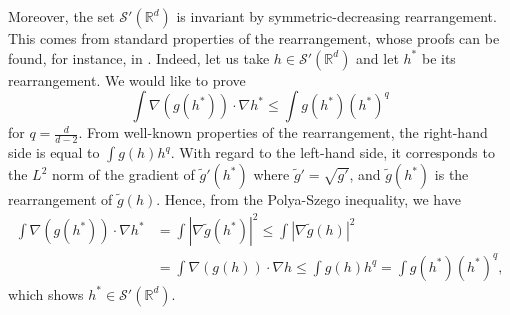 \documentclass[11pt,a4paper]{article}
\numberwithin{equation}{section}
\newcommand{\R}{{\mathbb{R}}}
\theoremstyle{plain}
\theoremstyle{remark}
\newcommand {\f}{\frac}
\begin{document}
Moreover, the set $\mathcal{S'}(\R^d)$ is invariant by symmetric-decreasing rearrangement. This comes from standard properties of the rearrangement, whose proofs can be found, for instance, in \cite{Elliot_Loss01}.
Indeed, let us take $h\in \mathcal{S'}(\R^d)$ and let $h^*$ be its rearrangement. We would like to prove 
$$ 
    \int \nabla(g(h^*))\cdot\nabla h^*\leq\int g(h^*) (h^*)^q 
$$
for $q = \frac{d}{d-2}$.
From well-known properties of the rearrangement, the right-hand side is equal to   $\int g(h) h^q$. With regard to   the left-hand side, it corresponds to the $L^2$ norm of the gradient of $\tilde g'(h^*)$ where $\tilde g'=\sqrt{g'}$, and  $\tilde g(h^*)$ is the rearrangement of  $\tilde g(h)$. Hence, from the Polya-Szego inequality, we have
\begin{align*}
    \int \nabla(g(h^*))\cdot\nabla h^* & = \int |\nabla \tilde g(h^*)|^2\leq  \int |\nabla \tilde g(h)|^2\\
    &= \int \nabla(g(h))\cdot\nabla h\leq \int g(h) h^q=\int g(h^*) (h^*)^q,
\end{align*}
which shows $h^*\in \mathcal{S'}(\R^d)$.
%
%
%
%
%
%
%
\end{document}
